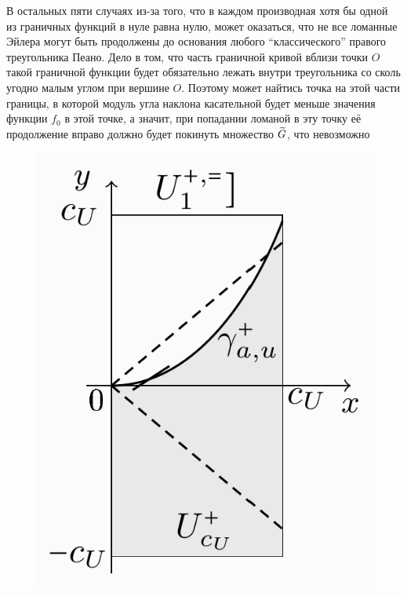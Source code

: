 В остальных пяти случаях из-за того, что в каждом производная хотя бы одной из граничных функций в нуле равна нулю, может оказаться, что не все ломанные Эйлера могут быть продолжены до основания любого ``классического'' правого треугольника Пеано. Дело в том, что часть граничной кривой вблизи точки $ O $ такой граничной функции будет обязательно лежать внутри треугольника со сколь угодно малым углом при вершине $ O $. Поэтому может найтись точка на этой части границы, в которой модуль угла наклона касательной будет меньше значения функции $ f_0 $ в этой точке, а значит, при попадании ломаной в эту точку её продолжение вправо должно будет покинуть множество $ \widetilde{G} $, что невозможно

\begin{figure}[!h]
    \includegraphics[scale=0.3]{boundary_curves_3}
\end{figure}

